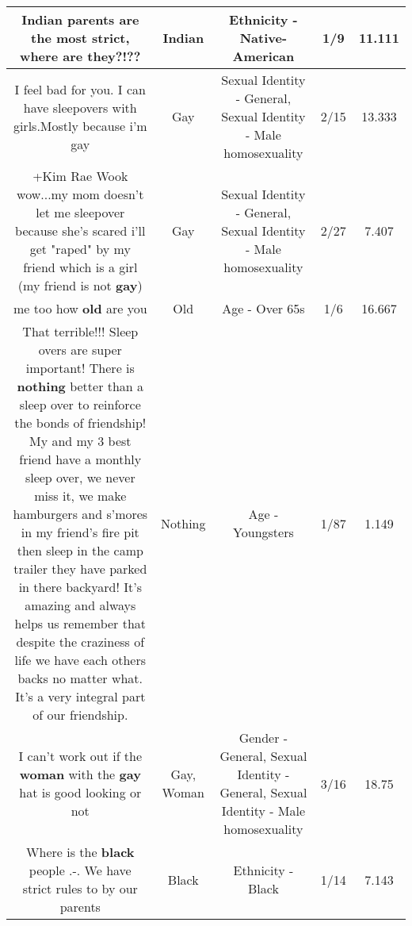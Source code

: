 \documentclass[11pt]{article}
\newlength\mylength
\begin{document}
\begin{center}
\begin{longtable}{|C{.65\mylength}|C{.30\mylength}|C{.12\mylength}|C{.12\mylength}|C{.12\mylength}|}
  \small Indian parents are the most strict, where are they?!??\normalsize   & Indian & Ethnicity - Native-American & 1/9 & 11.111 \\  \hline
  \small I feel bad for you. I can have sleepovers with girls.Mostly because i'm gay\normalsize   & Gay & Sexual Identity - General, Sexual Identity - Male homosexuality & 2/15 & 13.333 \\  \hline
  \small +Kim Rae Wook wow...my mom doesn't let me sleepover because she's scared i'll get "raped" by my friend which is a girl (my friend is not \textbf{g\textbf{ay}})\normalsize   & Gay & Sexual Identity - General, Sexual Identity - Male homosexuality & 2/27 & 7.407 \\  \hline
  \small me too how \textbf{old} are you\normalsize   & Old & Age - Over 65s & 1/6 & 16.667 \\  \hline
  \small That terrible!!! Sleep overs are super important! There is \textbf{nothing} better than a sleep over to reinforce the bonds of friendship! My and my 3 best friend have a monthly sleep over, we never miss it, we make hamburgers and s'mores in my friend's fire pit then sleep in the camp trailer they have parked in there backyard! It's amazing and always helps us remember that despite the craziness of life we have each others backs no matter what. It's a very integral part of our friendship.\normalsize   & Nothing & Age - Youngsters & 1/87 & 1.149 \\  \hline
  \small I can't work out if the \textbf{woman} with the \textbf{g\textbf{ay}} hat is good looking or not\normalsize   & Gay, Woman & Gender - General, Sexual Identity - General, Sexual Identity - Male homosexuality & 3/16 & 18.75 \\  \hline
  \small Where is the \textbf{black} people .-. We have strict rules to by our parents\normalsize   & Black & Ethnicity - Black & 1/14 & 7.143 \\  \hline

\end{longtable}
\end{center}
\end{document}
